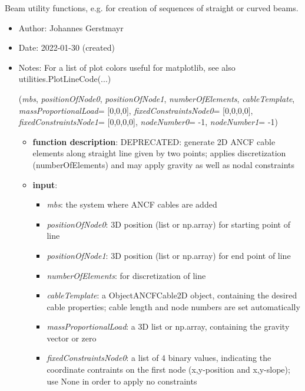 \begin{itemize}[leftmargin=1.4cm]
\begin{itemize}[leftmargin=1.4cm]
\begin{itemize}[leftmargin=1.4cm]
\begin{itemize}[leftmargin=0.5cm]
%
\label{sec:module:beams}
  Beam utility functions, e.g. for creation of sequences of straight or curved beams.
\begin{itemize}[leftmargin=1.4cm]
\setlength{\itemindent}{-1.4cm}
\item[]Author:    Johannes Gerstmayr
\item[]Date:      2022-01-30 (created)
\item[]Notes:     For a list of plot colors useful for matplotlib, see also utilities.PlotLineCode(...)
\ei
\begin{flushleft}
\label{sec:beams:GenerateStraightLineANCFCable2D}
({\it mbs}, {\it positionOfNode0}, {\it positionOfNode1}, {\it numberOfElements}, {\it cableTemplate}, {\it massProportionalLoad}= [0,0,0], {\it fixedConstraintsNode0}= [0,0,0,0], {\it fixedConstraintsNode1}= [0,0,0,0], {\it nodeNumber0}= -1, {\it nodeNumber1}= -1)
\end{flushleft}
\setlength{\itemindent}{0.7cm}
\begin{itemize}[leftmargin=0.7cm]
\item[--]
{\bf function description}: DEPRECATED: generate 2D ANCF cable elements along straight line given by two points; applies discretization (numberOfElements) and may apply gravity as well as nodal constraints
\item[--]
{\bf input}: \vspace{-6pt}
\begin{itemize}[leftmargin=1.2cm]
\setlength{\itemindent}{-0.7cm}
\item[]{\it mbs}: the system where ANCF cables are added
\item[]{\it positionOfNode0}: 3D position (list or np.array) for starting point of line
\item[]{\it positionOfNode1}: 3D position (list or np.array) for end point of line
\item[]{\it numberOfElements}: for discretization of line
\item[]{\it cableTemplate}: a ObjectANCFCable2D object, containing the desired cable properties; cable length and node numbers are set automatically
\item[]{\it massProportionalLoad}: a 3D list or np.array, containing the gravity vector or zero
\item[]{\it fixedConstraintsNode0}: a list of 4 binary values, indicating the coordinate contraints on the first node (x,y-position and x,y-slope); use None in order to apply no constraints

\end{itemize}
\end{itemize}
\end{itemize}
\end{itemize}
\end{itemize}
\end{itemize}
\end{itemize}
